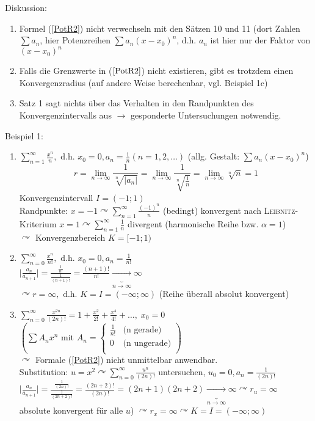 \documentclass[a4paper]{scrartcl}
\begin{document}
Diskussion:
\begin{enumerate}
\item Formel (\ref{PotR2}) nicht verwechseln mit den Sätzen 10 und 11 (dort Zahlen $\sum a_n$, hier Potenzreihen $\sum a_n (x -x_0)^n$, d.h. $a_n$ ist hier nur der Faktor von $(x- x_0)^n$
\item Falls die Grenzwerte in ($\ref{PotR2}$) nicht existieren, gibt es trotzdem  einen Konvergenzradius (auf andere Weise berechenbar, vgl. Beispiel 1c)
\item Satz 1 sagt nichts über das Verhalten in den Randpunkten des Konvergenzintervalls aus $\rightarrow$ gesponderte Untersuchungen notwendig.
\end{enumerate}

Beispiel 1:
\begin{enumerate}
\item $\sum\limits_{n=1}^{\infty} \frac{x^n}{n},$ d.h. $x_0 = 0, a_n = \frac{1}{n} (n=1,2,\dots)$ (allg. Gestalt: $\sum a_n (x - x_0 )^n$)
\[ r = \lim\limits_{n \to \infty} \frac{1}{\sqrt[n]{\lvert a_n \rvert}} = \lim\limits_{n \to \infty} \frac{1}{\sqrt[n]{\frac{1}{n}}} = \lim\limits_{n \to \infty} \sqrt[n]{n} = 1\]
Konvergenzintervall $I=(-1;1)$\\
Randpunkte: $x=-1 \curvearrowright \sum\limits_{n=1}^{\infty} \frac{(-1)^n}{n}$ (bedingt) konvergent nach \textsc{Leibnitz}-Kriterium
$x=1 \curvearrowright \sum\limits_{n=1}^{\infty} \frac{1}{n}$ divergent (harmonische Reihe bzw. $\alpha = 1$)\\
$\curvearrowright$ Konvergenzbereich $K=[-1;1)$
\item $\sum\limits_{n=0}^{\infty} \frac{x^n}{n!}, \text{ d.h. } x_0 = 0, a_n = \frac{1}{n!}$\\
$\lvert \frac{a_n}{a_{n+1}} \rvert  = \frac{\frac{1}{n!}}{\frac{1}{(n+1)!}} = \frac{(n+1)!}{n!} \underbrace{\rightarrow}_{n \to \infty} \infty$\\
$\curvearrowright r = \infty, \text{ d.h. } K=I=(-\infty;\infty)$ (Reihe überall absolut konvergent)
\item $\sum\limits_{n=0}^{\infty} \frac{x^{2n}}{(2n)!} = 1 + \frac{x^2}{2!} + \frac{x^4}{4!} + \dots, \; x_0 = 0$\\
$(\sum A_n x^n \text{ mit } A_n = \left\{ \begin{array}{lr} \frac{1}{n!} & \mbox{(n gerade)}\\ 0 & \mbox{(n ungerade)}\\ \end{array} \right. )$\\
$\curvearrowright$ Formale (\ref{PotR2}) nicht unmittelbar anwendbar.\\
Substitution: $u=x^2 \curvearrowright \sum\limits_{n = 0}^{\infty} \frac{u^n}{(2n)!}$ untersuchen, $u_0 = 0, a_n = \frac{1}{(2n)!}$\\
$\lvert \frac{a_n}{a_{n+1}} \rvert = \frac{\frac{1}{(2n)!}}{\frac{1}{(2n+2)!}} = \frac{(2n+2)!}{(2n)!} = (2n + 1)(2n +2) \underbrace{\rightarrow}_{n \to \infty} \infty \curvearrowright r_u = \infty$\\
absolute konvergent für alle $u$) $\curvearrowright r_x = \infty \curvearrowright K=I=(-\infty;\infty)$
\end{enumerate}
\end{document}
